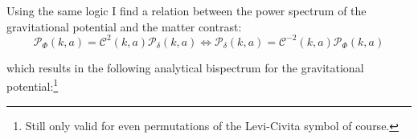 

            Using the same logic I find a relation between the power spectrum of the gravitational potential and the matter contrast:
            \begin{equation}
                \mathcal{P}_\Phi(k,a) = \mathcal{C}^2(k, a) \mathcal{P}_\delta(k,a) \Longleftrightarrow \mathcal{P}_\delta(k,a) = \mathcal{C}^{-2}(k, a) \mathcal{P}_\Phi(k,a)
            \end{equation}

            which results in the following analytical bispectrum for the gravitational potential:\footnote{Still only valid for even permutations of the Levi-Civita symbol of course.}


